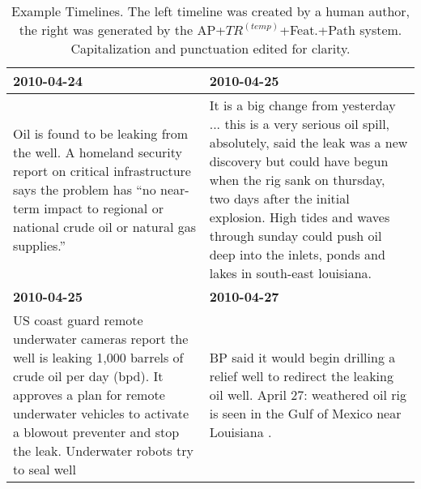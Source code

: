 \documentclass[a4paper,BCOR=10mm]{report}
\numberwithin{lemma}{chapter}
\numberwithin{definition}{chapter}
\begin{document}
\begin{table}
\begin{tabularx}{1.2\textwidth}{|X|X|}
\textbf{2010-04-24} & \textbf{2010-04-25} \\\hline
Oil is found to be leaking from the well. \newline A homeland security report on critical infrastructure says the problem has ``no near-term impact to regional or national crude oil or natural gas supplies.'' & It is a big change from yesterday ... this is a very serious oil spill, absolutely, said the leak was a new discovery but could have begun when the rig sank on thursday, two days after the initial explosion. \newline High tides and waves through sunday could push oil deep into the inlets, ponds and lakes in south-east louisiana. \\\hline
\textbf{2010-04-25} & \textbf{2010-04-27} \\\hline
US coast guard remote underwater cameras report the well is leaking 1,000 barrels of crude oil per day (bpd). \newline It approves a plan for remote underwater vehicles to activate a blowout preventer and stop the leak. \newline Underwater robots try to seal well & BP said it would begin drilling a relief well to redirect the leaking oil well. \newline April 27: weathered oil rig is seen in the Gulf of Mexico near Louisiana . \\\hline
\end{tabularx}
\caption{Example Timelines. The left timeline was created by a human author, the right was generated by the AP+$TR^{(temp)}$+Feat.+Path system. Capitalization and punctuation edited for clarity.}
\label{tab:tlbp}
\end{table}
\end{document}
